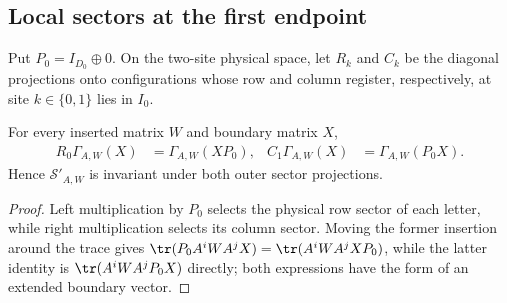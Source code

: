 \subsection{Local sectors at the first endpoint}

\begin{definition}
    \label{def:mpo_mixed_physical_sectors}
    \leanok
    Put $P_0=I_{D_0}\oplus0$.
    On the two-site physical space, let $R_k$ and $C_k$ be the diagonal
    projections onto configurations whose row and column register,
    respectively, at site $k\in\{0,1\}$ lies in $I_0$.
\end{definition}

\begin{lemma}
    \label{thm:mpo_mixed_outer_sectors}
    \leanok
    For every inserted matrix $W$ and boundary matrix $X$,
    \begin{align}
        R_0\Gamma_{A,W}(X) & =\Gamma_{A,W}(XP_0),
                           & C_1\Gamma_{A,W}(X)   & =\Gamma_{A,W}(P_0X).
        \label{eq:mpo_mixed_outer_sectors}
    \end{align}
    Hence $\mathcal S'_{A,W}$ is invariant under both outer sector projections.
\end{lemma}
\begin{proof}
    \leanok
    Left multiplication by $P_0$ selects the physical row sector of each
    letter, while right multiplication selects its column sector.
    Moving the former insertion around the trace gives
    $\tr(P_0A^iWA^jX)=\tr(A^iWA^jXP_0)$, while the latter identity is
    $\tr(A^iWA^jP_0X)$ directly; both expressions have the form of an
    extended boundary vector.
\end{proof}

